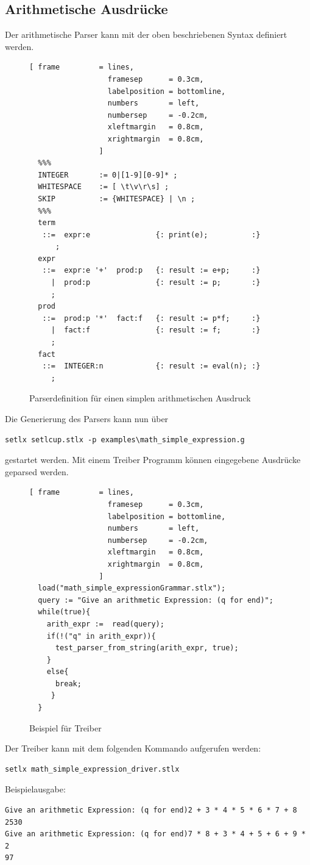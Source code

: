 \subsection{Arithmetische Ausdrücke}
Der arithmetische Parser  kann mit der oben beschriebenen Syntax definiert werden.
\begin{figure}[!ht]
\begin{Verbatim}[ frame         = lines, 
                  framesep      = 0.3cm, 
                  labelposition = bottomline,
                  numbers       = left,
                  numbersep     = -0.2cm,
                  xleftmargin   = 0.8cm,
                  xrightmargin  = 0.8cm,
                ]
  %%%
  INTEGER       := 0|[1-9][0-9]* ;
  WHITESPACE    := [ \t\v\r\s] ;
  SKIP          := {WHITESPACE} | \n ;
  %%%
  term 
   ::=  expr:e               {: print(e);          :}
      ;
  expr 
   ::=  expr:e '+'  prod:p   {: result := e+p;     :}
     |  prod:p               {: result := p;       :}
     ;
  prod 
   ::=  prod:p '*'  fact:f   {: result := p*f;     :}
     |  fact:f               {: result := f;       :}
     ;
  fact 
   ::=  INTEGER:n            {: result := eval(n); :} 
     ;
\end{Verbatim}
\caption{Parserdefinition für einen simplen arithmetischen Ausdruck}
\label{fig:example_arithmetic_grammer}
\end{figure}
%
Die Generierung des Parsers kann nun über
\begin{Verbatim}
setlx setlcup.stlx -p examples\math_simple_expression.g
\end{Verbatim}
gestartet werden.
Mit einem Treiber Programm können eingegebene Ausdrücke geparsed werden.
\begin{figure}[!htb]
\begin{Verbatim}[ frame         = lines, 
                  framesep      = 0.3cm, 
                  labelposition = bottomline,
                  numbers       = left,
                  numbersep     = -0.2cm,
                  xleftmargin   = 0.8cm,
                  xrightmargin  = 0.8cm,
                ]
  load("math_simple_expressionGrammar.stlx");
  query := "Give an arithmetic Expression: (q for end)";
  while(true){
    arith_expr :=  read(query);
    if(!("q" in arith_expr)){
      test_parser_from_string(arith_expr, true);
    }
    else{
      break;
     }
  }
\end{Verbatim}
\caption{Beispiel für Treiber}
\label{fig:simple_arith_driver}
\end{figure}
Der Treiber kann mit dem folgenden Kommando aufgerufen werden:
\begin{Verbatim}
setlx math_simple_expression_driver.stlx
\end{Verbatim}
Beispielausgabe:
\begin{Verbatim}
Give an arithmetic Expression: (q for end)2 + 3 * 4 * 5 * 6 * 7 + 8
2530
Give an arithmetic Expression: (q for end)7 * 8 + 3 * 4 + 5 + 6 + 9 * 2
97
\end{Verbatim}
